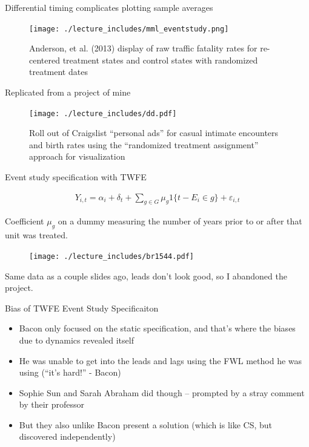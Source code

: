 \documentclass{beamer}
\begin{document}
\begin{frame}{Differential timing complicates plotting sample averages}

	\begin{figure}
	\texttt{[image: ./lecture\_includes/mml\_eventstudy.png]}
	\caption{Anderson, et al. (2013) display of raw traffic fatality rates for re-centered treatment states and control states with randomized treatment dates}
	\end{figure}

\end{frame}

\begin{frame}{Replicated from a project of mine}

	\begin{figure}
	\texttt{[image: ./lecture\_includes/dd.pdf]}
	\caption{Roll out of Craigslist ``personal ads'' for casual intimate encounters and birth rates using the ``randomized treatment assignment'' approach for visualization}
	\end{figure}

\end{frame}

\begin{frame}{Event study specification with TWFE}


\begin{eqnarray*}
Y_{i,t} = \alpha_i + \delta_t + \sum_{g \in G} \mu_g1\{t-E_i \in g \} + \varepsilon_{i,t}
\end{eqnarray*}

\bigskip

Coefficient $\mu_g$ on a dummy measuring the number of years prior to or after that unit was treated.  

\end{frame}

\begin{frame}[plain]
	\begin{figure}
	\texttt{[image: ./lecture\_includes/br1544.pdf]}
	\end{figure}
	
Same data as a couple slides ago, leads don't look good, so I abandoned the project. 
	
\end{frame}

\begin{frame}{Bias of TWFE Event Study Specificaiton}

\begin{itemize}
\item Bacon only focused on the static specification, and that's where the biases due to dynamics revealed itself
\item He was unable to get into the leads and lags using the FWL method he was using (``it's hard!'' - Bacon)
\item Sophie Sun and Sarah Abraham did though -- prompted by a stray comment by their professor
\item But they also unlike Bacon present a solution (which is like CS, but discovered independently)
\end{itemize}

\end{frame}
\end{document}
